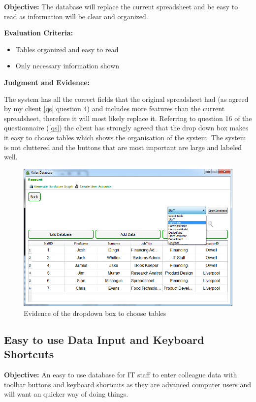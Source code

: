 \textbf{Objective:} The database will replace the current spreadsheet and be easy to read as information will be clear and organized.

\textbf{Evaluation Criteria:}
\begin{itemize}
\item{Tables organized and easy to read}
\item{Only necessary information shown}
\end{itemize}

\textbf{Judgment and Evidence:}

The system has all the correct fields that the original spreadsheet had (as agreed by my client \ref{qs} question 4) and includes more features than the current spreadsheet, therefore it will most likely replace it. Referring to question 16 of the questionnaire (\ref{qs}) the client has strongly agreed that the drop down box makes it easy to choose tables which shows the organisation of the system. The system is not cluttered and the buttons that are most important are large and labeled well.

\begin{figure}[H]
    \includegraphics[width=\textwidth]{./Evaluation/Images/cleardb2.png}
    \caption{Evidence of the dropdown box to choose tables} 
\end{figure}

\subsection{Easy to use Data Input and Keyboard Shortcuts}

\textbf{Objective:} An easy to use database for IT staff to enter colleague data with toolbar buttons and keyboard shortcuts as they are advanced computer users and will want an quicker way of doing things.

